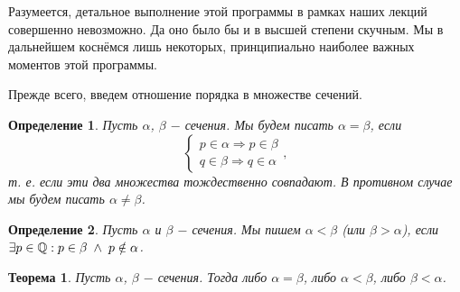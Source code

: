\documentclass{article}
\newtheorem{theorem}{Теорема}[section]
\newtheorem{definition}{Определение}[section]
\begin{document}
Разумеется, детальное выполнение этой программы в рамках наших лекций совершенно невозможно. Да оно было бы и в высшей степени скучным. Мы в дальнейшем коснёмся лишь некоторых, принципиально наиболее важных моментов этой программы.

Прежде всего, введем отношение порядка в множестве сечений.

\begin{definition}
Пусть \(\alpha\), \(\beta\) \(-\) сечения. Мы будем писать \(\alpha = \beta\), если 
\[
	\begin{cases}
    	p \in \alpha \Rightarrow p \in \beta \\
      	q \in \beta \Rightarrow q \in \alpha
    \end{cases},      
\]
т. е. если эти два множества тождественно совпадают. В противном случае мы будем писать \(\alpha \neq \beta\).
\end{definition}

\begin{definition}
Пусть \(\alpha\) и \(\beta\) \(-\) сечения. Мы пишем \(\alpha < \beta\) (или \(\beta > \alpha\)), если \(\exists p \in \mathbb{Q} : p \in \beta \hspace{1mm} \land \hspace{1mm} p \notin \alpha\).
\end{definition}

\begin{theorem}
Пусть \(\alpha\), \(\beta\) \(-\) сечения. Тогда либо \(\alpha = \beta\), либо \(\alpha < \beta\), либо \(\beta < \alpha\).
\end{theorem}
\end{document}

